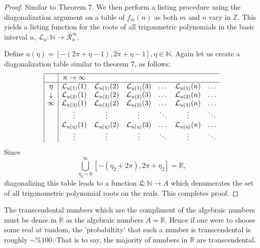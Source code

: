 \documentclass[letter]{article}
\newenvironment{menumerate}{%
  \edef\backupindent{\the\parindent}%
  \enumerate%
  \setlength{\parindent}{\backupindent}%
}{\endenumerate}
\begin{document}
\begin{menumerate}
\begin{menumerate}
\begin{proof}
 		 		 Similar to Theorem 7. We then perform a listing procedure using the diagonalization argument on a table of $f_m(n)$ as both $m$ and $n$ vary in $\mathbb{Z}.$ This yields a listing function for the roots of all trigonmetric polynomials in the basic interval $u$, $\mathcal{L}_u:\mathbb{N} \to \mathcal{R}_u^\infty.$

 		 		 Define $u(\eta) = [-(2\pi + \eta-1), 2\pi + \eta-1], \eta \in \mathbb{N}.$ Again let us create a diagonalization table similar to theorem 7, as follows:
 		 		 \begin{equation*}	
	 		 				\begin{array}{|c|cccccc}
	 		 					\hline
								  & n \to \infty & \\
								\hline
								 \eta & \mathcal{L}_{u(1)}(1) & \mathcal{L}_{u(1)}(2) & \mathcal{L}_{u(1)}(3) & \dots & \mathcal{L}_{u(1)}(n) &\dots \\
								 \downarrow  & \mathcal{L}_{u(2)}(1) & \mathcal{L}_{u(2)}(2) & \mathcal{L}_{u(2)}(3) & \dots   & \mathcal{L}_{u(2)}(n) &\dots  \\
								  \infty & \mathcal{L}_{u(3)}(1) & \mathcal{L}_{u(3)}(2) & \mathcal{L}_{u(3)}(3) & \dots  & \mathcal{L}_{u(3)}(n) & \dots   \\
								  & \vdots & \vdots & \vdots &\ddots & \vdots & \ddots \\
								  & \mathcal{L}_{u(\eta)}(1) & \mathcal{L}_{u(\eta)}(2) & \mathcal{L}_{u(\eta)}(3) & \dots & \mathcal{L}_{u(\eta)}(n) & \dots \\
								   & \vdots & \vdots & \vdots &\ddots & \vdots & \ddots \\
							\end{array}
	 		 			\end{equation*}
 		 			Since $$\bigcup_{\eta_2=0}^\infty\left[-(\eta_2+2\pi), 2\pi + \eta_2\right] = \mathbb{R},$$diagonalizing this table leads to a function $\mathfrak{L}:\mathbb{N}\to A$ which denumerates the set of all trigonometric polynomial roots on the reals. This completes proof.
 		 		\end{proof}
 		 		\item The transcendental numbers which are the compliment of the algebraic numbers must be dense in $\mathbb{R}$ as the algebraic numbers $A \nsim \mathbb{R}.$ Hence if one were to choose some real at random, the 'probabiltity' that such a number is  transcendental is roughly $\sim\%100$. That is to say, the majority of numbers in $\mathbb{R}$ are transcendental.
	 		 \end{menumerate} 
\end{menumerate}
\end{document}
